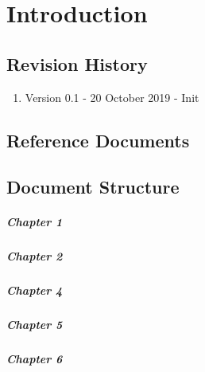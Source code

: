 \documentclass[../rasd.tex]{subfiles}
\begin{document}
\chapter{Introduction}
\thispagestyle{fancy}
		
		
		
		
		
	
		\section{Revision History}
		\begin{enumerate}
			\item Version 0.1 - 20 October 2019 - Init

		\end{enumerate}
		\section{Reference Documents}
		\section{Document Structure}

		\paragraph{Chapter 1}

		\paragraph{Chapter 2}


%

		\paragraph{Chapter 4}

		\paragraph{Chapter 5}

		\paragraph{Chapter 6}

		
\end{document}
